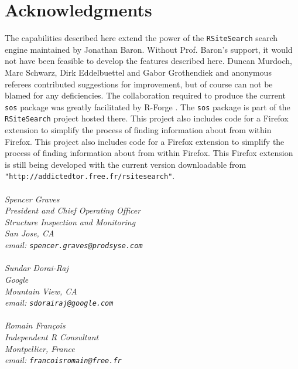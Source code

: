 \section*{Acknowledgments}
The capabilities described here extend the power of the
{\tt RSiteSearch} search engine maintained by Jonathan Baron.
Without Prof. Baron's support, it would not have been feasible
to develop the features described here.  Duncan Murdoch, Marc Schwarz,
Dirk Eddelbuettel and Gabor Grothendiek and anonymous
referees contributed suggestions for improvement, but of course
can not be blamed for any deficiencies.  The collaboration
required to produce the current {\tt sos} package was greatly
facilitated by R-Forge \citep{RFORGE09URL}. The {\tt sos} package
is part of the {\tt RSiteSearch} project hosted there.  This project
also includes code for a Firefox extension to simplify the process of
finding information about \R{} from within Firefox.  This project
also includes code for a Firefox extension to simplify the process of
finding information about \R{} from within Firefox.  This Firefox
extension is still being developed with the current version
downloadable from
{\tt "http://addictedtor.free.fr/rsitesearch"}.
\\ \\
\emph{Spencer Graves \\
President and Chief Operating Officer \\
Structure Inspection and Monitoring \\
San Jose, CA \\
email:  {\tt spencer.graves@prodsyse.com} }
\\ \\
\emph{Sundar Dorai-Raj \\
Google \\
Mountain View, CA \\
email:  {\tt sdorairaj@google.com} }
\\ \\
\emph{Romain Fran{\c c}ois \\
Independent R Consultant \\
Montpellier, France \\
email: {\tt francoisromain@free.fr} }
